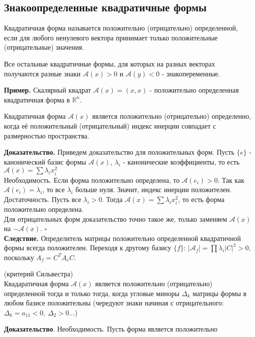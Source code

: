  \subsection{Знакоопределенные квадратичные формы}
 \begin{defin}
 Квадратичная форма называется положительно (отрицательно) определенной, если
 для любого ненулевого вектора принимает только положительные (отрицательные)
 значения.
 \end{defin}
 Все остальные квадратичные формы, для которых на разных векторах получаются
 разные знаки $\mathcal A(x)>0$ и $\mathcal A(y)<0$ - знакопеременные. 

\textbf{Пример.} Скалярный квадрат $\mathcal A(x)=(x,x)$ - положительно 
определенная квадратичная форма в $\mathbb R^n$.
\begin{theor}\label{opred_indexs}
Квадратичная форма $\mathcal A(x)$ является положительно (отрицательно) 
определенно, когда её положительный (отрицательный) индекс инерции совпадает
с размерностью пространства.
\end{theor}
\textbf{Доказательство.} Приведем доказательство для положительных форм. 
Пусть $\{e\}$ - канонический базис формы $\mathcal A(x)$, $\lambda_i$ - 
канонические коэффициенты, то есть $\mathcal A(x)=\sum\lambda_ix_i^2$\\
Необходимость. Если форма положительно определена, то $\mathcal A(e_i)>0$. 
Так как $\mathcal A(e_i)=\lambda_i$, то все $\lambda_i$ больше нуля. Значит,
индекс инерции положителен.\\
Достаточность. Пусть все $\lambda_i>0$. Тогда $\mathcal A(x)=
\sum\lambda_ix_i^2$, то есть форма положительно определена. \\
Для отрицательных форм доказательство точно такое же, только заменяем 
$\mathcal A(x)$ на $-\mathcal A(x)$. $\square$\\
\textbf{Следствие.} Определитель матрицы положительно определенной квадратичной
формы всегда положителен. 
Переходя к другому базису $\{f\}$: $|\mathcal A_f|=\prod\lambda_i|C|^2>0$,
поскольку $A_f=C^TA_eC$.
\begin{theor}
(критерий Сильвестра)\\
Квадаратичная форма $\mathcal A(x)$ является положительно (отрицательно) 
определенной тогда и только тогда, когда угловые миноры $\Delta_k$ матрицы 
формы в любом базисе положительны (чередуют знаки начиная с отрицательного:
$\Delta_k=a_{11}<0,~\Delta_2>0...$) 
\end{theor}
\textbf{Доказательство}. Необходимость. Пусть форма является положительно 
